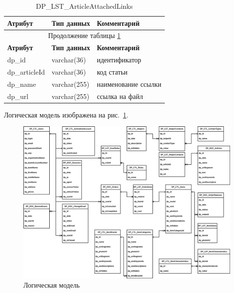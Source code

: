 \begin{longtable}{|p{5.5cm}|p{3.5cm}|p{7.5cm}|}
    \caption{DP\_LST\_ArticleAttachedLinks} \label{tab:DP_LST_ArticleAttachedLinks} \\
    \hline
    \textbf{Атрибут} & \textbf{Тип данных} & \textbf{Комментарий} \\ \hline
    \endfirsthead

    \multicolumn{3}{c}{Продолжение таблицы \ref{tab:DP_LST_ArticleAttachedLinks}} \\
    \hline
    \textbf{Атрибут} & \textbf{Тип данных} & \textbf{Комментарий} \\ \hline
    \endhead

    \endfoot

    \endlastfoot
    dp\_id & varchar(36) & идентификатор \\ \hline
    dp\_articleId & varchar(36) & код статьи \\ \hline
    dp\_name & varchar(255) & наименование ссылки \\ \hline
    dp\_url & varchar(255) & ссылка на файл \\ \hline
\end{longtable}

Логическая модель изображена на рис.~\ref{fig:db_logic_model}.

\begin{figure}[!p]
    \centering

    \includegraphics[angle=90, width=18cm]
    {images/db/db.png}

    \caption{Логическая модель}

    \label{fig:db_logic_model}
\end{figure}
